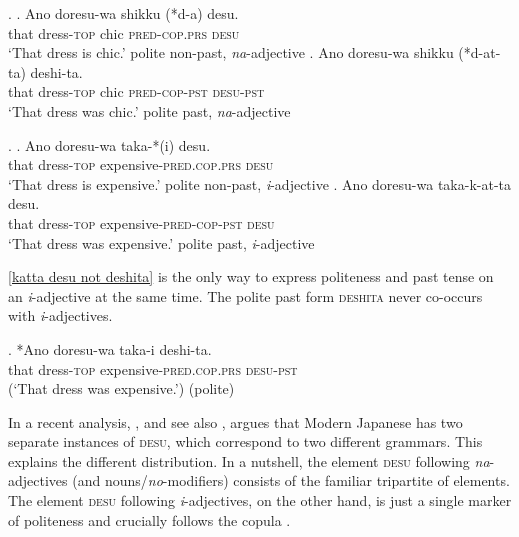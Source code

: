 \ex. \ag. Ano doresu-wa shikku (*d-a) desu.\\
that dress-\textsc{top} chic \textsc{pred-cop.prs} \textsc{desu}\\
`That dress is chic.' \null \hfill polite non-past, \textit{na}-adjective
 \bg. Ano doresu-wa shikku (*d-at-ta) deshi-ta.\\
that dress-\textsc{top} chic \textsc{pred-cop-pst} \textsc{desu}-\textsc{pst}\\
`That dress was chic.' \null \hfill polite past, \textit{na}-adjective


\ex. \ag. Ano doresu-wa taka-*(i) desu.\\
that dress-\textsc{top} expensive-\textsc{pred.cop.prs} \textsc{desu}\\
`That dress is expensive.' \null \hfill polite non-past, \textit{i}-adjective
\bg. Ano doresu-wa taka-k-at-ta desu.\\
that dress-\textsc{top} expensive-\textsc{pred-cop-pst} \textsc{desu}\\
`That dress was expensive.' \null \hfill polite past, \textit{i}-adjective \label{katta desu not deshita}

\ref{katta desu not deshita} is the only way to express politeness and past tense on an \textit{i}-adjective at the same time. The polite past form \textsc{deshita} never co-occurs with \textit{i}-adjectives.

\exg. *Ano doresu-wa taka-i deshi-ta.\\
that dress-\textsc{top} expensive-\textsc{pred.cop.prs} \textsc{desu}-\textsc{pst}\\
(`That dress was expensive.’) (polite)

In a recent analysis, \citet{yamada:2023:looking}, and see also \citet{miyagawa:2022:syntax}, argues that Modern Japanese has two separate instances of \textsc{desu}, which correspond to two different grammars. This explains the different distribution. In a nutshell, the element \textsc{desu} following \textit{na}-adjectives (and nouns/\textit{no}-modifiers) consists of the familiar tripartite of elements. The element \textsc{desu} following \textit{i}-adjectives, on the other hand, is just a single marker of politeness and crucially follows the copula \citep[2–4]{yamada:2023:looking}.

